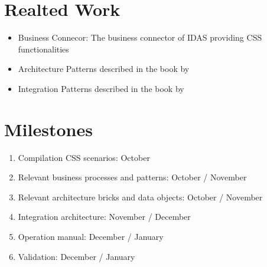 \documentclass{article}
\begin{document}
\section{Realted Work}

\begin{itemize}
    \item Business Connecor: The business connector of IDAS providing CSS functionalities
    \item Architecture Patterns described in the book by \cite{architecturePatterns}
    \item Integration Patterns described in the book by \cite{integrationPatterns}
\end{itemize}

\section{Milestones}

\begin{enumerate}
    \item Compilation CSS scenarios: October
    \item Relevant business processes and patterns: October / November
    \item Relevant architecture bricks and data objects: October / November
    \item Integration architecture: November / December
    \item Operation manual: December / January
    \item Validation: December / January
\end{enumerate}

\printbibliography
\end{document}
